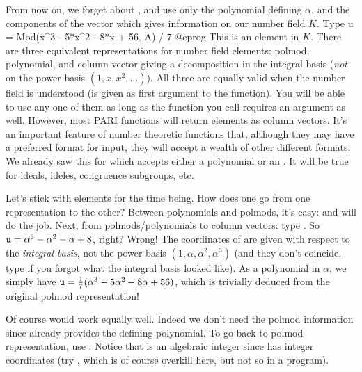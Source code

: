 From now on, we forget about , and use only the polynomial
 defining $\alpha$, and the components of the vector  which
gives information on our number field $K$. Type
\bprog
  u = Mod(x^3 - 5*x^2 - 8*x + 56, A) / 7
@eprog\noindent
This is an element in $K$. There are three equivalent
representations for number field elements: polmod, polynomial, and column
vector giving a decomposition in the integral basis  (\emph{not} on
the power basis $(1,x,x^2,\dots)$). All three are equally valid when the
number field is understood (is given as first argument to the function).
You will be able to use any one of them as long as the function you call
requires an  argument as well. However, most PARI functions will
return elements as column vectors. It's an important feature of number
theoretic functions that, although they may have a preferred format for
input, they will accept a wealth of other different formats. We already saw
this for  which accepts either a polynomial or an . It
will be true for ideals, ideles, congruence subgroups, etc.

  Let's stick with elements for the time being. How does one go from one
representation to the other? Between polynomials and polmods, it's easy:
 and  will do the job. Next, from polmods/polynomials to
column vectors: type . So ${\tt u} = \alpha^3-
\alpha^2 - \alpha + 8$, right? Wrong! The coordinates of  are given
with respect to the \emph{integral basis}, not the power basis
$(1,\alpha,\alpha^2,\alpha^3)$ (and they don't coincide, type  if
you forgot what the integral basis looked like). As a polynomial in $\alpha$,
we simply have ${\tt u} = {1\over7}(\alpha^3 - 5\alpha^2-8\alpha+56)$, which
is trivially deduced from the original polmod representation!

Of course  would work equally well. Indeed
we don't need the polmod information since  already provides the
defining polynomial. To go back to polmod representation, use
. Notice that  is an algebraic integer since
 has integer coordinates (try , which is of
course overkill here, but not so in a program).

